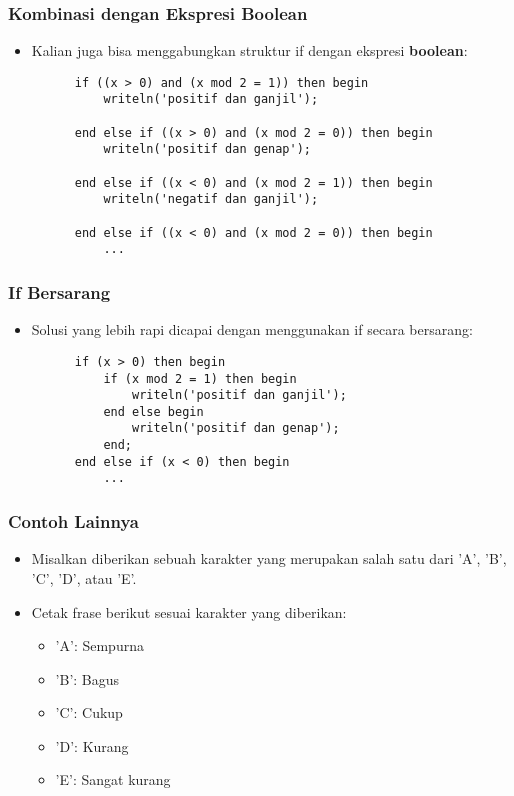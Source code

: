\documentclass{beamer}
\begin{document}
\begin{frame}[fragile]
\frametitle{Kombinasi dengan Ekspresi Boolean}
\begin{itemize}
    \item Kalian juga bisa menggabungkan struktur if dengan ekspresi \textbf{boolean}:
    \begin{lstlisting}
      if ((x > 0) and (x mod 2 = 1)) then begin
          writeln('positif dan ganjil');

      end else if ((x > 0) and (x mod 2 = 0)) then begin
          writeln('positif dan genap');

      end else if ((x < 0) and (x mod 2 = 1)) then begin
          writeln('negatif dan ganjil');

      end else if ((x < 0) and (x mod 2 = 0)) then begin
          ...
    \end{lstlisting}
\end{itemize}
\end{frame}

\begin{frame}[fragile]
\frametitle{If Bersarang}
\begin{itemize}
    \item Solusi yang lebih rapi dicapai dengan menggunakan if secara bersarang:
    \begin{lstlisting}
      if (x > 0) then begin
          if (x mod 2 = 1) then begin
              writeln('positif dan ganjil');
          end else begin
              writeln('positif dan genap');
          end;
      end else if (x < 0) then begin
          ...
    \end{lstlisting}
\end{itemize}
\end{frame}

\begin{frame}
\frametitle{Contoh Lainnya}
\begin{itemize}
    \item Misalkan diberikan sebuah karakter yang merupakan salah satu dari 'A', 'B', 'C', 'D', atau 'E'.
    \item Cetak frase berikut sesuai karakter yang diberikan:
    \begin{itemize}
        \item 'A': Sempurna
        \item 'B': Bagus
        \item 'C': Cukup
        \item 'D': Kurang
        \item 'E': Sangat kurang
    \end{itemize}
\end{itemize}
\end{frame}
\end{document}
